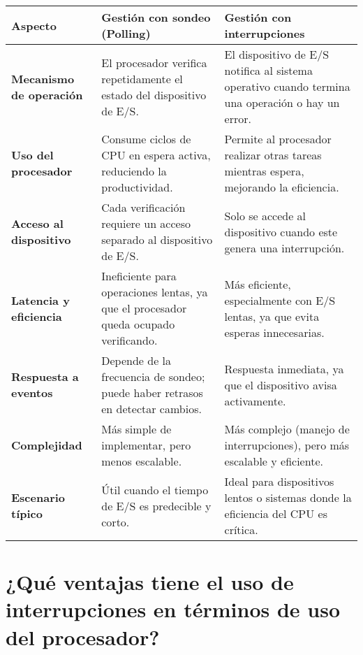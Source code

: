 \documentclass{article}
\begin{document}
\begin{table}[h]
\centering
\label{tab:comparacion}
\begin{tabular}{>{\raggedright\arraybackslash}p{4cm}>{\raggedright\arraybackslash}p{5cm}>{\raggedright\arraybackslash}p{5cm}}
\toprule
\textbf{Aspecto} & \textbf{Gestión con sondeo (Polling)} & \textbf{Gestión con interrupciones} \\
\midrule
\textbf{Mecanismo de operación} & El procesador verifica repetidamente el estado del dispositivo de E/S. & El dispositivo de E/S notifica al sistema operativo cuando termina una operación o hay un error. \\
\addlinespace

\textbf{Uso del procesador} & Consume ciclos de CPU en espera activa, reduciendo la productividad. & Permite al procesador realizar otras tareas mientras espera, mejorando la eficiencia. \\
\addlinespace

\textbf{Acceso al dispositivo} & Cada verificación requiere un acceso separado al dispositivo de E/S. & Solo se accede al dispositivo cuando este genera una interrupción. \\
\addlinespace

\textbf{Latencia y eficiencia} & Ineficiente para operaciones lentas, ya que el procesador queda ocupado verificando. & Más eficiente, especialmente con E/S lentas, ya que evita esperas innecesarias. \\
\addlinespace

\textbf{Respuesta a eventos} & Depende de la frecuencia de sondeo; puede haber retrasos en detectar cambios. & Respuesta inmediata, ya que el dispositivo avisa activamente. \\
\addlinespace

\textbf{Complejidad} & Más simple de implementar, pero menos escalable. & Más complejo (manejo de interrupciones), pero más escalable y eficiente. \\
\addlinespace

\textbf{Escenario típico} & Útil cuando el tiempo de E/S es predecible y corto. & Ideal para dispositivos lentos o sistemas donde la eficiencia del CPU es crítica. \\
\bottomrule
\end{tabular}
\end{table}

\section{¿Qué ventajas tiene el uso de interrupciones en términos de uso del procesador?}
\end{document}
